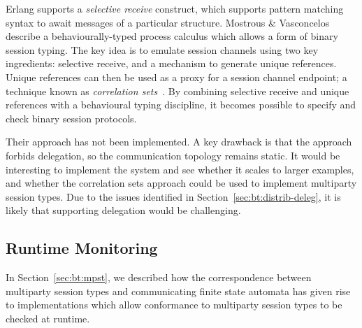 \documentclass[
graybox,
envcountchap
]{svmult}
\begin{document}
\begin{bibunit}
  Erlang supports a \emph{selective receive} construct, which supports pattern
  matching syntax to await messages of a particular structure.
  Mostrous \& Vasconcelos~\cite{MostrousV11:session-erlang} describe a
  behaviourally-typed process calculus which allows a form of binary session
  typing. The key idea is to emulate session channels using two key ingredients:
  selective receive, and a mechanism to generate unique references. Unique
  references can then be used as a proxy for a session channel endpoint; a
  technique known as \emph{correlation sets}~\cite{Viroli04a:correlation}. By
  combining selective receive and unique references with a behavioural typing
  discipline, it becomes possible to specify and check binary session protocols.

  Their approach has not been implemented. A key drawback is that the approach
  forbids delegation, so the communication topology remains static. It would be
  interesting to implement the system and see whether it scales to larger
  examples, and whether the correlation sets approach could be used to implement
  multiparty session types. Due to the issues identified in
  Section~\ref{sec:bt:distrib-deleg}, it is likely that supporting
  delegation would be challenging.

  \subsection{Runtime Monitoring}
  In Section~\ref{sec:bt:mpst}, we described how the correspondence between
  multiparty session types and communicating finite state automata has given
  rise to implementations which allow conformance to multiparty session types to
  be checked at runtime.

  \begin{figure}[t]


\end{figure}
\end{bibunit}
\end{document}
